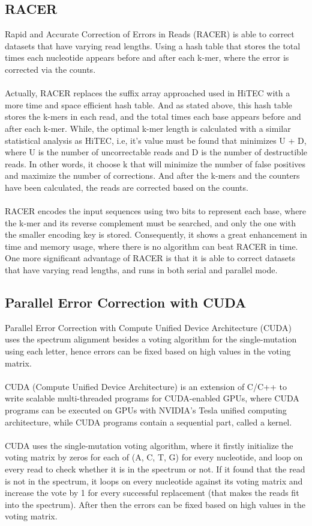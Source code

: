 \documentclass[12pt,openany]{llncs}
\begin{document}
\subsection{RACER}
Rapid and Accurate Correction of Errors in Reads (RACER) \cite{Racer} is able to correct datasets that have varying read lengths. Using a hash table that stores the total times each nucleotide appears before and after each k-mer, where the error is corrected via the counts.
\\
\\
Actually, RACER replaces the suffix array approached used in HiTEC with a more time and space efficient hash table. And as stated above, this hash table stores the k-mers in each read, and the total times each base appears before and after each k-mer. While, the optimal k-mer length is calculated with a similar statistical analysis as HiTEC, i.e, it's value must be found that minimizes U + D, where U is the number of uncorrectable reads and D is the number of destructible reads. In other words, it choose k that will minimize the number of false positives and maximize the number of corrections. And after the k-mers and the counters have been calculated, the reads are corrected based on the counts.
\\
\\
RACER encodes the input sequences using two bits to represent each base, where the k-mer and its reverse complement must be searched, and only the one with the smaller encoding key is stored. Consequently, it shows a great enhancement in time and memory usage, where there is no algorithm can beat RACER in time.
\\
One more significant advantage of RACER is that it is able to correct datasets that have varying read lengths, and runs in both serial and parallel mode.
 

\subsection{Parallel Error Correction with CUDA}
Parallel Error Correction with Compute Unified Device Architecture (CUDA) \cite{Cuda} uses the spectrum alignment besides a voting algorithm for the single-mutation using each letter, hence errors can be fixed based on high values in the voting matrix.
\\
\\
CUDA (Compute Unified Device Architecture) is an extension of C/C++ to write scalable multi-threaded programs for CUDA-enabled GPUs, where CUDA programs can be executed on GPUs with NVIDIA’s Tesla unified computing architecture, while CUDA programs contain a sequential part, called a kernel.
\\
\\
CUDA uses the single-mutation voting algorithm, where it firstly initialize the voting matrix by zeros for each of (A, C, T, G) for every nucleotide, and loop on every read to check whether it is in the spectrum or not. If it found that the read is not in the spectrum, it loops on every nucleotide against its voting matrix and increase the vote by 1 for every successful replacement (that makes the reads fit into the spectrum). After then the errors can be fixed based on high values in the voting matrix.
\end{document}
